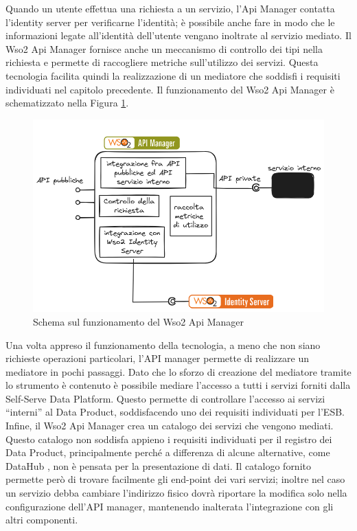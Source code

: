 \documentclass[12pt]{report}
\begin{document}
Quando un utente effettua una richiesta a un servizio, l'Api Manager contatta l'identity server per verificarne l'identità; è possibile anche fare in modo che le informazioni legate all'identità dell'utente vengano inoltrate al servizio mediato.
Il Wso2 Api Manager fornisce anche un meccanismo di controllo dei tipi nella richiesta e permette di raccogliere metriche sull'utilizzo dei servizi. 
Questa tecnologia facilita quindi la realizzazione di un mediatore che soddisfi i requisiti individuati nel capitolo precedente.
Il funzionamento del Wso2 Api Manager è schematizzato nella Figura \ref{funzionamento_api_manager}.
\begin{figure}[H]
    \centering
    \includegraphics[width=\linewidth]{immagini/wso2 apim schema.png}
    \caption{Schema sul funzionamento del Wso2 Api Manager}
    \label{funzionamento_api_manager}
\end{figure}
Una volta appreso il funzionamento della tecnologia, a meno che non siano richieste operazioni particolari, l'API manager permette di realizzare un mediatore in pochi passaggi.
Dato che lo sforzo di creazione del mediatore tramite lo strumento è contenuto è possibile mediare l'accesso a tutti i servizi forniti dalla Self-Serve Data Platform.
Questo permette di controllare l'accesso ai servizi ``interni'' al Data Product, soddisfacendo uno dei requisiti individuati per l'ESB.
Infine, il Wso2 Api Manager crea un catalogo dei servizi che vengono mediati. 
Questo catalogo non soddisfa appieno i requisiti individuati per il registro dei Data Product, principalmente perché a differenza di alcune alternative, come DataHub \cite{datahub}, non è pensata per la presentazione di dati.
Il catalogo fornito permette però di trovare facilmente gli end-point dei vari servizi; inoltre nel caso un servizio debba cambiare l'indirizzo fisico dovrà riportare la modifica solo nella configurazione dell'API manager, mantenendo inalterata l'integrazione con gli altri componenti.
\end{document}
